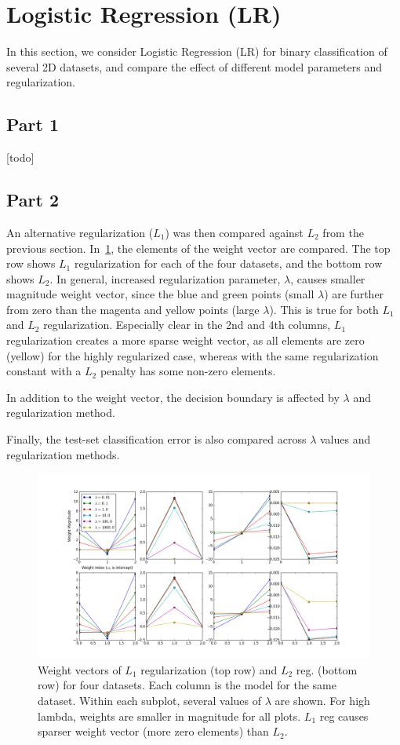 \section{Logistic Regression (LR)} \label{sec:prob1}
In this section, we consider Logistic Regression (LR) for binary classification of several 2D datasets, and compare the effect of different model parameters and regularization.

\subsection{Part 1}
[todo]




\subsection{Part 2}
An alternative regularization ($L_1$) was then compared against $L_2$ from the previous section.
In~\cref{fig:1_2_all_weights_good}, the elements of the weight vector are compared.
The top row shows $L_1$ regularization for each of the four datasets, and the bottom row shows $L_2$.
In general, increased regularization parameter, $\lambda$, causes smaller magnitude weight vector, since the blue and green points (small $\lambda$) are further from zero than the magenta and yellow points (large $\lambda$).
This is true for both $L_1$ and $L_2$ regularization.
Especially clear in the 2nd and 4th columns, $L_1$ regularization creates a more sparse weight vector, as all elements are zero (yellow) for the highly regularized case, whereas with the same regularization constant with a $L_2$ penalty has some non-zero elements.

In addition to the weight vector, the decision boundary is affected by $\lambda$ and regularization method. 

Finally, the test-set classification error is also compared across $\lambda$ values and regularization methods.


\begin{figure}
	\centering
	\includegraphics [trim=0 0 0 0, clip, angle=0, width=0.8\columnwidth,
	keepaspectratio]{figures/1_2_all_weights_good}
	\caption{Weight vectors of $L_1$ regularization (top row) and $L_2$ reg. (bottom row) for four datasets. Each column is the model for the same dataset. Within each subplot, several values of $\lambda$ are shown. For high lambda, weights are smaller in magnitude for all plots. $L_1$ reg causes sparser weight vector (more zero elements) than $L_2$.}
	\label{fig:1_2_all_weights_good} 
\end{figure}

